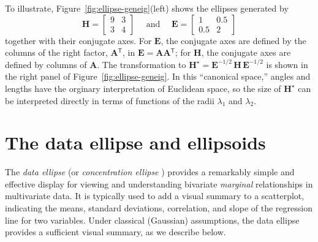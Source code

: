 \documentclass[11pt]{article}%
\newcommand*{\figref}[1]{Figure~\ref{#1}}
\newcommand{\trans}{\ensuremath{^\mathsf{T}}}
\newcommand*{\mat}[1]{\ensuremath{\bm{#1}}}
\newcommand*{\invhalf}[1]{\ensuremath{\mat{#1}^{-1/2}}}
\begin{document}
To illustrate, \figref{fig:ellipse-geneig}(left) shows 
the ellipses generated by
\begin{equation*}
 \mat{H} = \left[ \begin{array}{cc}
                   9 & 3 \\
                   3 & 4
                  \end{array}\right] 
 \quad \mbox{ and } \quad
 \mat{E} = \left[ \begin{array}{cc}
                   1 & 0.5 \\
                   0.5 & 2
                  \end{array}\right] 
\end{equation*}
together with their conjugate axes. For \mat{E}, the conjugate axes are defined by the columns of the right factor,
$\mat{A}\trans$,
in $\mat{E} = \mat{A} \mat{A}\trans$; for \mat{H}, the conjugate axes are defined by columns of $\mat{A}$.
The transformation to $\mat{H}^\star = \invhalf{E} \, \mat{H} \, \invhalf{E}$ is shown in the right panel
of \figref{fig:ellipse-geneig}. In this ``canonical space,'' angles and lengths have the orginary interpretation
of Euclidean space, so the size of $\mat{H}^\star$ can be interpreted directly in terms of functions of
the radii $\lambda_1$ and $\lambda_2$.


\section{The data ellipse and ellipsoids}\label{sec:data-ellipse}
The \emph{data ellipse} \citep{Monette:90} (or \emph{concentration ellipse} \citet[Ch. 7]{Dempster:69})
provides a remarkably
simple and effective display for viewing and understanding
bivariate \emph{marginal} relationships in multivariate data.
It is typically used to add a visual summary to a scatterplot,
indicating the means, standard deviations, correlation,
and slope of the regression line for
two variables. Under classical (Gaussian) assumptions, the data ellipse
provides a sufficient visual summary, as we describe below.
\end{document}
